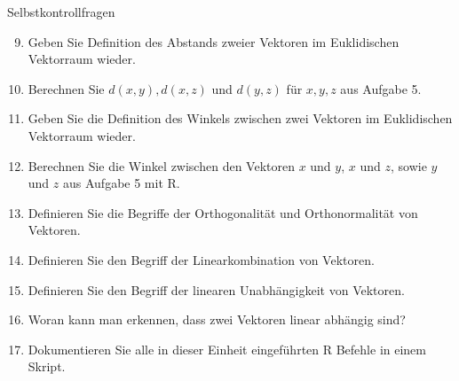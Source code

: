 \documentclass[
  8pt,
  ignorenonframetext,
]{beamer}
\providecommand{\tightlist}{%
  \setlength{\itemsep}{0pt}\setlength{\parskip}{0pt}}
\begin{document}
\begin{frame}{Selbstkontrollfragen}
\protect\hypertarget{selbstkontrollfragen-1}{}
\footnotesize
{}

\begin{enumerate}
\setcounter{enumi}{8}
\tightlist
\item
  Geben Sie Definition des Abstands zweier Vektoren im Euklidischen
  Vektorraum wieder.
\item
  Berechnen Sie \(d(x,y), d(x,z)\) und \(d(y,z)\) für \(x,y,z\) aus
  Aufgabe 5.
\item
  Geben Sie die Definition des Winkels zwischen zwei Vektoren im
  Euklidischen Vektorraum wieder.
\item
  Berechnen Sie die Winkel zwischen den Vektoren \(x\) und \(y\), \(x\)
  und \(z\), sowie \(y\) und \(z\) aus Aufgabe 5 mit R.
\item
  Definieren Sie die Begriffe der Orthogonalität und Orthonormalität von
  Vektoren.
\item
  Definieren Sie den Begriff der Linearkombination von Vektoren.
\item
  Definieren Sie den Begriff der linearen Unabhängigkeit von Vektoren.
\item
  Woran kann man erkennen, dass zwei Vektoren linear abhängig sind?
\item
  Dokumentieren Sie alle in dieser Einheit eingeführten R Befehle in
  einem Skript.
\end{enumerate}
\end{frame}
\end{document}

